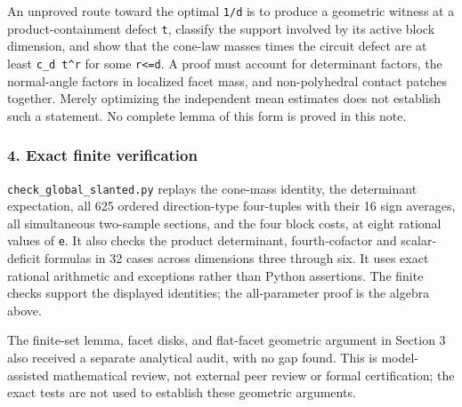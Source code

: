 \documentclass[
  11pt,
]{article}
\begin{document}
An unproved route toward the optimal \texttt{1/d} is to produce a
geometric witness at a product-containment defect \texttt{t}, classify
the support involved by its active block dimension, and show that the
cone-law masses times the circuit defect are at least
\texttt{c\_d\ t\^{}r} for some \texttt{r\textless{}=d}. A proof must
account for determinant factors, the normal-angle factors in localized
facet mass, and non-polyhedral contact patches together. Merely
optimizing the independent mean estimates does not establish such a
statement. No complete lemma of this form is proved in this note.

\subsubsection{4. Exact finite
verification}\label{exact-finite-verification-1}

\texttt{check\_global\_slanted.py} replays the cone-mass identity, the
determinant expectation, all 625 ordered direction-type four-tuples with
their 16 sign averages, all simultaneous two-sample sections, and the
four block costs, at eight rational values of \texttt{e}. It also checks
the product determinant, fourth-cofactor and scalar-deficit formulas in
32 cases across dimensions three through six. It uses exact rational
arithmetic and exceptions rather than Python assertions. The finite
checks support the displayed identities; the all-parameter proof is the
algebra above.

The finite-set lemma, facet disks, and flat-facet geometric argument in
Section 3 also received a separate analytical audit, with no gap found.
This is model-assisted mathematical review, not external peer review or
formal certification; the exact tests are not used to establish these
geometric arguments.
\end{document}
